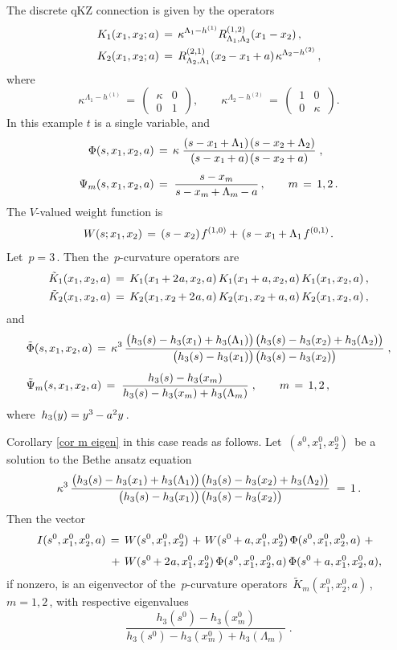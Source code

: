 \documentclass[12pt]{amsart}
\def\>{\relax\ifmmode\mskip.666667\thinmuskip\relax\else\kern.111111em\fi}
\def\<{\relax\ifmmode\mskip-.333333\thinmuskip\relax\else\kern-.0555556em\fi}
\theoremstyle{definition} %
\numberwithin{equation}{section}
\theoremstyle{definition}
\let\ka\kappa
\let\La\Lambda
\def\be{\begin{equation*}}
\def\ee{\end{equation*}}
\begin{document}
\smallskip
\noindent
The discrete qKZ connection is given by the operators
\begin{align*}
K_1(x_1,x_2;a)\, &{}=\,\ka^{\La_1-h^{(1)}}R^{(1,2)}_{\La_1,\La_2}(x_1-x_2)\,,
\\
K_2(x_1,x_2;a)\, &{}=\,R^{(2,1)}_{\La_2,\La_1}(x_2\<-x_1\<+a)\>\ka^{\La_2-h^{(2)}}\,,
\end{align*}
where
\be
\ka^{\La_1-h^{(1)}}\,=\,\begin{pmatrix} \,\ka & 0\,\\[2pt] \,0 & 1\,\end{pmatrix},\qquad
\ka^{\La_2-h^{(2)}}\,=\,\begin{pmatrix} \,1 & 0\,\\[2pt] \,0 & \ka\,\end{pmatrix}.
\ee
In this example $t$ is a single variable, and
\begin{align*}
\Phi(s,x_1,x_2,a)\, &{}=\,
\ka\;\frac{(s-x_1\<+\La_1)\>(s-x_2\<+\La_2)}{(s-x_1\<+a)\>(s-x_2\<+a)}\;,
\\[4pt]
\Psi_m(s,x_1,x_2,a)\, &{}=\;\frac{s-x_m}{s-x_m\<+\La_m\<-a}\,,\qquad m\,=\,1,2\,.
\end{align*}
The $V$-valued weight function is
\be
W(s;x_1,x_2)\,=\,(s-x_2)\> f^{(1,0)} +\>(s-x_1\<+\La_1\>f^{(0,1)}\>.
\ee
Let \,$p=3$\,. Then the \,$p$-curvature operators are
\begin{align*}
\tilde K_1(x_1,x_2,a)\,&{}=\,K_1(x_1\<+2\<\>a,x_2,a)\,K_1(x_1\<+a,x_2,a)\,K_1(x_1,x_2,a)\,,
\\
\tilde K_2(x_1,x_2,a)\,&{}=\,K_2(x_1,x_2\<+2\<\>a,a)\,K_2(x_1,x_2\<+a,a)\,K_2(x_1,x_2,a)\,,
\end{align*}
and
\begin{align*}
& \tilde\Phi(s,x_1,x_2,a)\,=\,
\ka^3\,\frac{\bigl(h_3(s)-h_3(x_1)+h_3(\La_1)\bigr)\>\bigl(h_3(s)-h_3(x_2)+h_3(\La_2)\bigr)}
{\bigl(h_3(s)-h_3(x_1)\bigr)\>\bigl(h_3(s)-h_3(x_2)\bigr)}\;,
\\[4pt]
& \tilde\Psi_m(s,x_1,x_2,a)\,=\;\frac{h_3(s)-h_3(x_m)}{h_3(s)-h_3(x_m)+h_3(\La_m)}\;,
\qquad m\,=\,1,2\,,
\end{align*}
where \,$h_3(y)=y^3\<-a^2y\,$.

\smallskip

Corollary \ref{cor m eigen} in this case reads as follows.
Let \,$(s^0, x_1^0,x_2^0)$ \,be a solution to the Bethe ansatz equation
\be
\ka^3\,\frac{\bigl(h_3(s)-h_3(x_1)+h_3(\La_1)\bigr)\>\bigl(h_3(s)-h_3(x_2)+h_3(\La_2)\bigr)}
{\bigl(h_3(s)-h_3(x_1)\bigr)\>\bigl(h_3(s)-h_3(x_2)\bigr)}\;=\,1\,.
\ee
Then the vector
\begin{align*}
I(s^0, x_1^0,x_2^0,a)\,&{}=\,W(s^0,x_1^0,x_2^0)\>+\>
W(s^0\<+a,x_1^0,x_2^0)\,\Phi(s^0,x_1^0,x_2^0,a)\>+{}
\\[3pt]
&{}\>+\,W(s^0\<+2\<\>a,x_1^0,x_2^0)\,\Phi(s^0,x_1^0,x_2^0,a)\,\Phi(s^0\<+a,x_1^0,x_2^0,a),
\end{align*}
if nonzero, 
is an eigenvector of the \,$p$-curvature operators \,$\tilde K_m(x_1^0,x_2^0,a)$\,,
\,$m=1,2$\,, with respective eigenvalues
\be
\frac{h_3(s^0)-h_3(x_m^0)}{h_3(s^0)-h_3(x_m^0)+h_3(\La_m)}\;.
\ee
\end{document}
